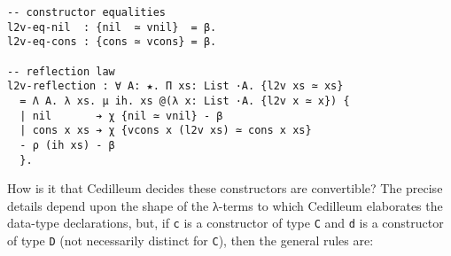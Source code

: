 \documentclass{article}
\begin{document}
\begin{verbatim}
-- constructor equalities
l2v-eq-nil  : {nil  ≃ vnil}  = β.
l2v-eq-cons : {cons ≃ vcons} = β.

-- reflection law
l2v-reflection : ∀ A: ★. Π xs: List ·A. {l2v xs ≃ xs}
  = Λ A. λ xs. μ ih. xs @(λ x: List ·A. {l2v x ≃ x}) {
  | nil       ➔ χ {nil ≃ vnil} - β
  | cons x xs ➔ χ {vcons x (l2v xs) ≃ cons x xs}
  - ρ (ih xs) - β
  }.
\end{verbatim}

How is it that Cedilleum decides these constructors are convertible? The precise
details depend upon the shape of the λ-terms to which Cedilleum elaborates the
data-type declarations, but, if \texttt{c} is a constructor of type \texttt{C}
and \texttt{d} is a constructor of type \texttt{D} (not necessarily distinct for
\texttt{C}), then the general rules are:
\end{document}
